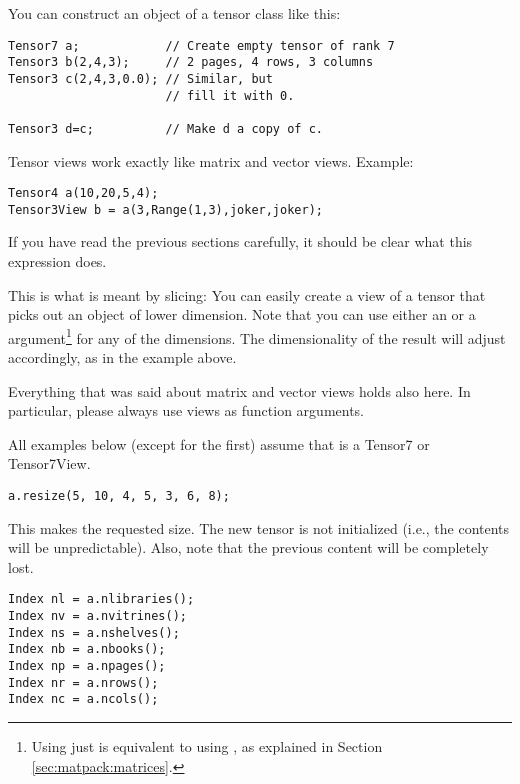 You can construct an object of a tensor class like this:

\begin{verbatim}
Tensor7 a;            // Create empty tensor of rank 7
Tensor3 b(2,4,3);     // 2 pages, 4 rows, 3 columns
Tensor3 c(2,4,3,0.0); // Similar, but
                      // fill it with 0.

Tensor3 d=c;          // Make d a copy of c.
\end{verbatim}



Tensor views work exactly like matrix and vector views. Example:
\begin{verbatim}
Tensor4 a(10,20,5,4);
Tensor3View b = a(3,Range(1,3),joker,joker);
\end{verbatim}
If you have read the previous sections carefully, it should be clear
what this expression does.

This is what is meant by slicing: You can easily create a view of a
tensor that picks out an object of lower dimension. Note that you can
use either an  or a 
argument\footnote{Using just  is equivalent to using
  , as explained in Section
  \ref{sec:matpack:matrices}.} for any of the dimensions. The
dimensionality of the result will adjust accordingly, as in the
example above.

Everything that was said about matrix and vector views holds also
here. In particular, please always use views as function arguments. 


All examples below (except for the first) assume that  is a
Tensor7 or Tensor7View.

\begin{verbatim}
a.resize(5, 10, 4, 5, 3, 6, 8);
\end{verbatim}
This makes  the requested size. The new tensor is not
initialized (i.e., the contents will be unpredictable). Also, note
that the previous content will be completely lost.

\begin{verbatim}
Index nl = a.nlibraries();
Index nv = a.nvitrines();
Index ns = a.nshelves();
Index nb = a.nbooks();
Index np = a.npages();
Index nr = a.nrows();
Index nc = a.ncols();
\end{verbatim}

